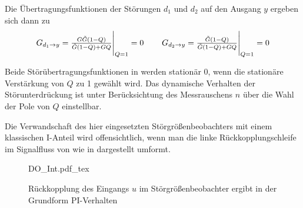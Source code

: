 %

Die Übertragungsfunktionen der Störungen $d_1$ und $d_2$ auf den Ausgang $y$ ergeben sich dann zu 
\begin{equation}
\setlength\arraycolsep{11pt}
\begin{matrix}
G_{d_1\rightarrow y} = \frac{G\tilde G(1-Q)}{\tilde G(1-Q)+GQ}\Biggr\rvert_{Q=1}=0
&
G_{d_2\rightarrow y} = \frac{\tilde G(1-Q)}{\tilde G(1-Q)+GQ}\Biggr\rvert_{Q=1}=0
\end{matrix}
\label{eq:DO1}
\end{equation}

Beide Störübertragungsfunktionen in  werden stationär $0$, wenn die stationäre Verstärkung von $Q$ zu 1 gewählt wird. Das dynamische Verhalten der Störunterdrückung ist unter Berücksichtung des Messrauschens $n$ über die Wahl der Pole von $Q$ einstellbar.


Die Verwandschaft des hier eingesetzten Störgrößenbeobachters mit einem klassischen I-Anteil wird offensichtlich, wenn man die linke Rückkopplungschleife im Signalfluss von  wie in  dargestellt umformt.

\begin{figure}[htp!]
\centering
{DO_Int.pdf_tex}
\caption{Rückkopplung des Eingangs $u$ im Störgrößenbeobachter ergibt in der Grundform PI-Verhalten}
\label{fig:DO_Int}
\end{figure}

